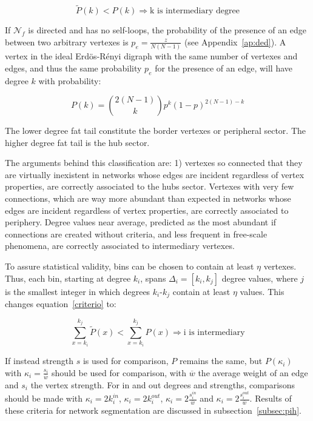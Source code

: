 \documentclass[%
 aip,
 jmp,%
 amsmath,amssymb,
 reprint,%
]{revtex4-1}
\begin{document}
\begin{equation}\label{criterio}
    \widetilde{P}(k)<P(k) \Rightarrow \text{k is intermediary degree}
\end{equation}

If $\mathcal{N}_f$ is directed and has no self-loops, the probability
of the presence of an edge between two arbitrary vertexes is $p_e=\frac{z}{N(N-1)}$ (see Appendix~\ref{ap:ded}).
A vertex in the ideal Erd\"os-R\'enyi digraph with the same number of vertexes and edges, and thus the same probability $p_e$ for the presence of an edge, will have degree $k$ with probability:

\begin{equation}
    P(k)=\binom{2(N-1)}{k}p^k(1-p)^{2(N-1)-k}
\end{equation}

The lower degree fat tail constitute the border
vertexes or peripheral sector. 
The higher degree fat tail is the hub sector.

The arguments behind this classification are: 1) vertexes so connected that they are virtually inexistent in networks whose edges are incident regardless of vertex properties, are correctly associated to the hubs sector. Vertexes with very few connections, which are way more abundant than expected in networks whose edges are incident regardless of vertex properties, are correctly associated to periphery. Degree values near average, predicted as the most abundant if connections are created without criteria, and less frequent in free-scale phenomena, are correctly associated to intermediary vertexes.

To assure statistical validity, bins can be chosen to contain at least $\eta$ vertexes. Thus, each bin, starting at degree $k_i$, spans $\Delta_i=[k_{i},k_{j}]$ degree values, where $j$ is the smallest integer in which degrees $k_i$-$k_{j}$ contain at least $\eta$ values. This changes equation~\ref{criterio} to:

\begin{equation}\label{criterio2}
    \sum_{x=k_i}^{k_j} \widetilde{P}(x) < \sum_{x=k_i}^{k_j} P(x) \Rightarrow \text{i is intermediary}
\end{equation}

If instead strength $s$ is used for comparison, $P$ remains the same, but $P(\kappa_i)$ with $\kappa_i=\frac{s_i}{\overline{w}}$ should be used for comparison, with $\overline{w}$ the average weight of an edge and $s_i$ the vertex strength. For in and out degrees and strengths, comparisons should be made with $\kappa_i=2k_i^{in}$, $\kappa_i=2k_i^{out}$, $\kappa_i=2\frac{s_i^{in}}{\overline{w}}$ and $\kappa_i=2\frac{s_i^{out}}{\overline{w}}$. Results of these criteria for network segmentation are discussed in subsection~\ref{subsec:pih}.
\end{document}
